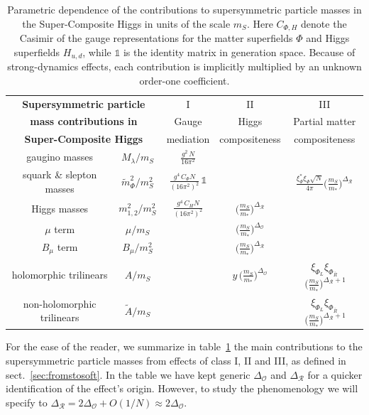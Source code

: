 \documentclass[a4paper,12pt]{article}
\def\id{\mathbb{1}}
\def\sec#1{sect.~\ref{#1}}
\def\O{\mathcal{O}}
\def\R{\mathcal{R}}
\def\mst{m_*}
\def\mS{m_S}
\begin{document}
\renewcommand{\arraystretch}{1.5}
\begin{table}[t]
\centering
\begin{tabular}{|c|c|c|c|c|}
\hline
\multicolumn{2}{|c|}{\bf Supersymmetric particle} & I&II&III  \vspace{-0.3cm}\\
\multicolumn{2}{|c|}{\bf mass contributions in}  & Gauge  & Higgs  & Partial matter  \vspace{-0.3cm} \\ 
\multicolumn{2}{|c|}{\bf Super-Composite Higgs} & mediation & compositeness  &  compositeness \\
\hline
gaugino masses& ${M_{\lambda}}/{\mS}$ & $\frac{g^2\, N}{16 \pi^2}$ & {}&\\
\hline
squark \& slepton masses & ${{\tilde m}_\Phi^2}/{\mS^2}$ & $\frac{g^4\, C_\Phi N}{(16 \pi^2)^2}${\footnotesize$\, \id$}&{}&$\frac{\xi_\Phi^*\xi_\Phi \sqrt{N}}{4\pi} \big( \frac{\mS}{\mst}\big)^{\Delta_\R}$ \\ \hline
Higgs masses & $m_{1,2}^2/\mS^2$ & $\frac{g^4\, C_{H} N}{(16 \pi^2)^2}$&$\big( \frac{\mS}{\mst}\big)^{\Delta_\R}$&{} \\ \hline
$\mu$ term & $\mu /\mS$ & {}&$\big( \frac{\mS}{\mst}\big)^{\Delta_\O}$&{} \\ \hline
$B_\mu$ term & $B_\mu /\mS^2$ & {}&$\big( \frac{\mS}{\mst}\big)^{\Delta_\R}$&{} \\ 
 \hline
 holomorphic trilinears  & $A/\mS$ & {}&$y\, \big( \frac{\mS}{\mst}\big)^{\Delta_\O}$ & {\footnotesize $\xi_{\Phi_L} \xi_{\Phi_{\bar R}}$}$\, \big( \frac{\mS}{\mst}\big)^{\Delta_\R +1}$\\ \hline
non-holomorphic trilinears  & $\tilde A/\mS$ & {}&{} & {\footnotesize $\xi_{\Phi_L} \xi_{\Phi_{\bar R}}$}$\, \big( \frac{\mS}{\mst}\big)^{\Delta_\R +1}$\\ \hline
\end{tabular}
\renewcommand{\arraystretch}{1}
\caption{Parametric dependence of the contributions to supersymmetric particle masses in the Super-Composite Higgs in units of the scale $\mS$. Here $C_{\Phi ,H}$ denote the Casimir of the gauge representations for the matter superfields $\Phi$ and Higgs superfields $H_{u,d}$, while $\id$ is the identity matrix in generation space. Because of strong-dynamics effects, each contribution is implicitly multiplied by an unknown order-one coefficient.}
\label{tab:soft}
\end{table}

For the ease of the reader, we summarize in table~\ref{tab:soft} the main  contributions to the supersymmetric particle masses from effects of class I, II and III, as defined  in \sec{sec:fromstosoft}. In the table we have kept generic $\Delta_\O$ and $\Delta_\R$ for a quicker identification of the effect's origin. However, to study the phenomenology we will specify to $\Delta_\R =2 \Delta_\O+O(1/N) \approx 2 \Delta_\O$.
\end{document}
